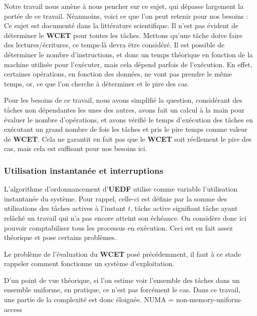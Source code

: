 		Notre travail nous amène à nous pencher sur ce sujet, qui dépasse largement la portée de ce travail. 
		Néanmoins, voici ce que l'on peut retenir pour nos besoins :\\
		Ce sujet est documenté dans la littérature scientifique. Il n'est pas évident de déterminer le 
		\textbf{WCET} pour toutes les tâches. Mettons qu'une tâche doive faire des lectures/écritures, 
		ce temps-là devra être considéré. Il est possible de déterminer le nombre d'instructions, 
		et donc un temps théorique en fonction de la machine utilisée pour l'exécuter, mais cela dépend 
		parfois de l'exécution. En effet, certaines opérations, en fonction des données, ne vont pas prendre 
		le même temps, or, ce que l'on cherche à déterminer et le pire des cas.\newline
	
		Pour les besoins de ce travail, nous avons simplifié la question, considérant des tâches 
		non dépendantes les unes des autres, avons fait un calcul à la main pour évaluer le 
		nombre d'opérations, et avons vérifié le temps d'exécution des tâches en exécutant un grand nombre 
		de fois les tâches et pris le pire temps comme valeur de \textbf{WCET}. Cela ne garantit en fait 
		pas que le \textbf{WCET} soit réellement le pire des cas, mais cela est suffisant pour nos besoins ici.
	
	\subsubsection{Utilisation instantanée et interruptions}

	L'algorithme d'ordonnancement d'\textbf{UEDF} utilise comme variable l'utilisation instantanée du système. 
	Pour rappel, celle-ci est définie par la somme des utilisations des tâches actives à l'instant $t$, 
	tâche active signifiant tâche ayant relâché un travail qui n'a pas encore atteint son échéance. 
	On considère donc ici pouvoir comptabiliser tous les processus en exécution. Ceci est 
	en fait assez théorique et pose certains problèmes.
	
	Le problème de l'évaluation du \textbf{WCET} posé précédemment, il faut à ce stade rappeler comment 
	fonctionne un système d'exploitation.
	
	D'un point de vue théorique, si l'on estime voir l'ensemble des tâches dans un ensemble uniforme, 
	en pratique, ce n'est pas forcément le cas. Dans ce travail, une partie de la complexité est 
	donc éloignée. NUMA = non-memory-uniform-access
	
